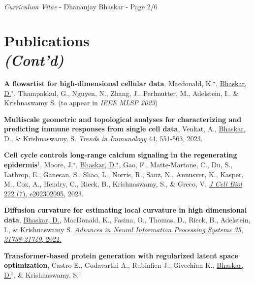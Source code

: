 \documentclass[margin,line]{res}
\begin{document}
\begin{resume}
\newpage
\begin{flushright}
\textit{Curriculum Vitae} - Dhananjay Bhaskar - Page 2/6
\end{flushright}
\vspace*{.15cm}

\section{\sc Publications\\\textit{(Cont'd)}}
{
\renewcommand\leftmargini{0em}
\begin{etaremune}[start=15]
\item{\bf A flowartist for high-dimensional cellular data},
Macdonald, K.$^\star$, \underline{Bhaskar, D.}$^\star$, Thampakkul, G., Nguyen, N., Zhang, J., Perlmutter, M., Adelstein, I., \& Krishnaswamy S.
(to appear in \textit{IEEE MLSP 2023})
\vspace*{.1cm}
\item{\bf Multiscale geometric and topological analyses for characterizing and predicting immune responses from single cell data},
Venkat, A., \underline{Bhaskar, D.}, \& Krishnaswamy, S.
\href{https://doi.org/10.1016/j.it.2023.05.003}{\textit{Trends in Immunology} 44, 551-563}, 2023.
\vspace*{.1cm}
\item{\bf Cell cycle controls long-range calcium signaling in the regenerating epidermis$^\dagger$}, 
Moore, J.$^\star$, \underline{Bhaskar, D.}$^\star$, Gao, F., Matte-Martone, C., Du, S., Lathrop, E., Ganesan, S., Shao, L., Norris, R., Sanz, N., Annusver, K., Kasper, M., Cox, A., Hendry, C., Rieck, B., Krishnaswamy, S., \& Greco, V.
\href{https://doi.org/10.1083/jcb.202302095}{\textit{J Cell Biol} 222 (7), e202302095}, 2023.
\vspace*{.1cm}
\item{\bf Diffusion curvature for estimating local curvature in high dimensional data},
\underline{Bhaskar, D.}, MacDonald, K., Fasina, O., Thomas, D., Rieck, B., Adelstein, I., \& Krishnaswamy S.
\href{https://proceedings.neurips.cc/paper_files/paper/2022/hash/88438dc62fc5c8777e2b5f1b4f6d37a2-Abstract-Conference.html}{\textit{Advances in Neural Information Processing Systems 35, 21738-21749}, 2022.}
\vspace*{.1cm}
\item{\bf Transformer-based protein generation with regularized latent space optimization}, 
Castro E., Godavarthi A., Rubinfien J., Givechian K., \underline{Bhaskar, D.}$^\ddagger$, \& Krishnaswamy, S.$^\ddagger$

\end{etaremune}}
\end{resume}
\end{document}
